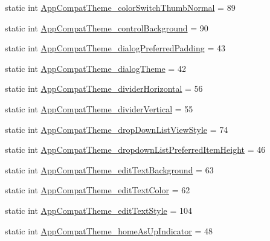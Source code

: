 \begin{DoxyCompactItemize}
\item 
static int \hyperlink{classandroid_1_1support_1_1v7_1_1mediarouter_1_1R_1_1styleable_aa3284b705f7b27b8788c23ea647f66df}{App\+Compat\+Theme\+\_\+color\+Switch\+Thumb\+Normal} = 89
\item 
static int \hyperlink{classandroid_1_1support_1_1v7_1_1mediarouter_1_1R_1_1styleable_a47c5659b0ee16f07cd6f1cf55cd650e3}{App\+Compat\+Theme\+\_\+control\+Background} = 90
\item 
static int \hyperlink{classandroid_1_1support_1_1v7_1_1mediarouter_1_1R_1_1styleable_a12d698145612528765b887b3bbbe63bb}{App\+Compat\+Theme\+\_\+dialog\+Preferred\+Padding} = 43
\item 
static int \hyperlink{classandroid_1_1support_1_1v7_1_1mediarouter_1_1R_1_1styleable_ae5022810b719a59e28a020ed0d2689d1}{App\+Compat\+Theme\+\_\+dialog\+Theme} = 42
\item 
static int \hyperlink{classandroid_1_1support_1_1v7_1_1mediarouter_1_1R_1_1styleable_af1934692686e513b4d05797f7f21f7c8}{App\+Compat\+Theme\+\_\+divider\+Horizontal} = 56
\item 
static int \hyperlink{classandroid_1_1support_1_1v7_1_1mediarouter_1_1R_1_1styleable_af04d015bffeaa6e33a461f5976092ee7}{App\+Compat\+Theme\+\_\+divider\+Vertical} = 55
\item 
static int \hyperlink{classandroid_1_1support_1_1v7_1_1mediarouter_1_1R_1_1styleable_a63a97be975b87c1a0d46a0ace55382ec}{App\+Compat\+Theme\+\_\+drop\+Down\+List\+View\+Style} = 74
\item 
static int \hyperlink{classandroid_1_1support_1_1v7_1_1mediarouter_1_1R_1_1styleable_a3a6ed7fa586db357c9b5385ac2be0ddf}{App\+Compat\+Theme\+\_\+dropdown\+List\+Preferred\+Item\+Height} = 46
\item 
static int \hyperlink{classandroid_1_1support_1_1v7_1_1mediarouter_1_1R_1_1styleable_a6fda1fd04dd1db6ea57c92f5116e4ccb}{App\+Compat\+Theme\+\_\+edit\+Text\+Background} = 63
\item 
static int \hyperlink{classandroid_1_1support_1_1v7_1_1mediarouter_1_1R_1_1styleable_a24e96622e17c6e06f00fb84f96e4c62b}{App\+Compat\+Theme\+\_\+edit\+Text\+Color} = 62
\item 
static int \hyperlink{classandroid_1_1support_1_1v7_1_1mediarouter_1_1R_1_1styleable_a397e422b63e3ca3295e55fd0a548cd24}{App\+Compat\+Theme\+\_\+edit\+Text\+Style} = 104
\item 
static int \hyperlink{classandroid_1_1support_1_1v7_1_1mediarouter_1_1R_1_1styleable_a1ce96df8d4a5f00bdb41453b81f64749}{App\+Compat\+Theme\+\_\+home\+As\+Up\+Indicator} = 48

\end{DoxyCompactItemize}
